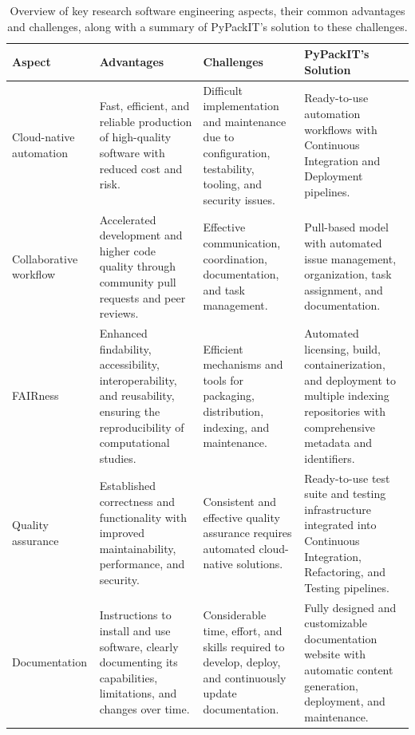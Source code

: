\documentclass{article}
\begin{document}
\begin{table}[h!]
\caption{Overview of key research software engineering aspects, their common advantages and challenges, along with a summary of PyPackIT's solution to these challenges.}
\label{tab:summary}
\begin{tabularx}{\textwidth}{>{\raggedright\arraybackslash}p{2.4cm} >{\raggedright\arraybackslash}X >{\raggedright\arraybackslash}X >{\raggedright\arraybackslash}X}
\toprule
\rowcolor{white} \textbf{Aspect}& \textbf{Advantages} & \textbf{Challenges} & \textbf{PyPackIT's Solution} \\
\midrule

Cloud-native automation & Fast, efficient, and reliable production of high-quality software with reduced cost and risk. & Difficult implementation and maintenance due to configuration, testability, tooling, and security issues. & Ready-to-use automation workflows with Continuous Integration and Deployment pipelines.\\

Collaborative workflow & Accelerated development and higher code quality through community pull requests and peer reviews. & Effective communication, coordination, documentation, and task management. & Pull-based model with automated issue management, organization, task assignment, and documentation.\\

FAIRness & Enhanced findability, accessibility, interoperability, and reusability, ensuring the reproducibility of computational studies. & Efficient mechanisms and tools for packaging, distribution, indexing, and maintenance. & Automated licensing, build, containerization, and deployment to multiple indexing repositories with comprehensive metadata and identifiers.\\

Quality assurance & Established correctness and functionality with improved maintainability, performance, and security. & Consistent and effective quality assurance requires automated cloud-native solutions. & Ready-to-use test suite and testing infrastructure integrated into Continuous Integration, Refactoring, and Testing pipelines.\\

Documentation & Instructions to install and use software, clearly documenting its capabilities, limitations, and changes over time. & Considerable time, effort, and skills required to develop, deploy, and continuously update documentation. & Fully designed and customizable documentation website with automatic content generation, deployment, and maintenance.\\


\end{tabularx}
\end{table}
\end{document}

